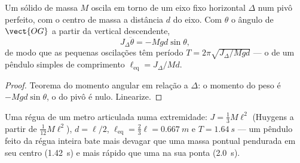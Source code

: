 \begin{proposition}\label{prop:b2:rigid-body-mechanics:pendulum}
Um sólido de massa $M$ oscila em torno de um eixo fixo horizontal
$\Delta$ num pivô perfeito, com o centro de massa a distância $d$ do
eixo. Com $\theta$ o ângulo de $\vect{OG}$ a partir da vertical
descendente,
\[
J_\Delta\ddot\theta = -Mgd\sin\theta ,
\]
de modo que as pequenas oscilações têm período $T = 2\pi\sqrt{J_\Delta/Mgd}$
--- o de um pêndulo simples de comprimento $\ell_{\text{eq}} = J_\Delta/Md$.
\end{proposition}

\begin{proof}
Teorema do momento angular em relação a $\Delta$: o momento do peso é
$-Mgd\sin\theta$, o do pivô é nulo. Linearize.
\end{proof}

\begin{example}\label{ex:b2:rigid-body-mechanics:rule}
Uma régua de um metro articulada numa extremidade: $J = \tfrac13M\ell^2$ (Huygens a
partir de $\tfrac1{12}M\ell^2$), $d = \ell/2$, $\ell_{\text{eq}} = \tfrac23\ell =
\qty{0.667}{m}$ e $T = \qty{1.64}{s}$ --- um pêndulo feito da régua inteira
bate mais devagar que uma massa pontual pendurada em seu centro (\qty{1.42}{s}) e mais
rápido que uma na sua ponta (\qty{2.0}{s}).
\end{example}

